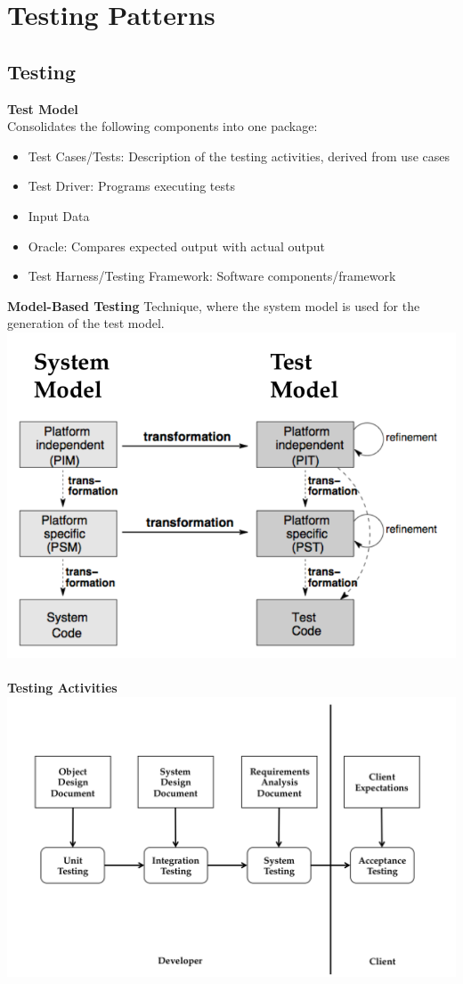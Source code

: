 
\section{Testing Patterns}

\subsection{Testing}
\textbf{Test Model}\\
Consolidates the following components into one package:
\begin{itemize}
  \item Test Cases/Tests: Description of the testing activities, derived from use cases
  \item Test Driver: Programs executing tests
  \item Input Data
  \item Oracle: Compares expected output with actual output
  \item Test Harness/Testing Framework: Software components/framework
\end{itemize}
\vspace{1em}
\textbf{Model-Based Testing}
Technique, where the system model is used for the generation of the test model.
\includegraphics[width=.5\linewidth]{images/testing_generating_test_code}\\
\\
\textbf{Testing Activities}\\
\includegraphics[width=.5\linewidth]{images/testing_activities.png}\\
